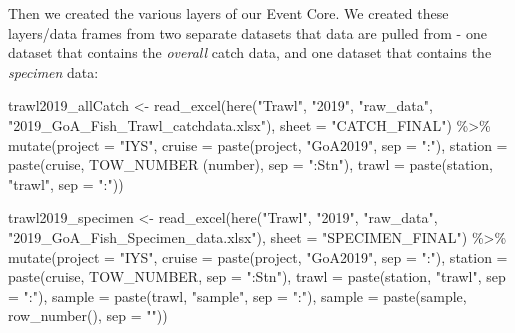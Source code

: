 \documentclass[
]{book}
\newenvironment{Shaded}{\begin{snugshade}}{\end{snugshade}}
\newcommand{\AttributeTok}[1]{\textcolor[rgb]{0.77,0.63,0.00}{#1}}
\newcommand{\FunctionTok}[1]{\textcolor[rgb]{0.00,0.00,0.00}{#1}}
\newcommand{\NormalTok}[1]{#1}
\newcommand{\OtherTok}[1]{\textcolor[rgb]{0.56,0.35,0.01}{#1}}
\newcommand{\SpecialCharTok}[1]{\textcolor[rgb]{0.00,0.00,0.00}{#1}}
\newcommand{\StringTok}[1]{\textcolor[rgb]{0.31,0.60,0.02}{#1}}
\begin{document}
Then we created the various layers of our Event Core. We created these layers/data frames from two separate datasets that data are pulled from - one dataset that contains the \emph{overall} catch data, and one dataset that contains the \emph{specimen} data:

\begin{Shaded}
\begin{Highlighting}[]
\NormalTok{trawl2019\_allCatch }\OtherTok{\textless{}{-}} \FunctionTok{read\_excel}\NormalTok{(}\FunctionTok{here}\NormalTok{(}\StringTok{"Trawl"}\NormalTok{, }\StringTok{"2019"}\NormalTok{, }\StringTok{"raw\_data"}\NormalTok{, }
                                      \StringTok{"2019\_GoA\_Fish\_Trawl\_catchdata.xlsx"}\NormalTok{), }\AttributeTok{sheet =} \StringTok{"CATCH\_FINAL"}\NormalTok{) }\SpecialCharTok{\%\textgreater{}\%}
  \FunctionTok{mutate}\NormalTok{(}\AttributeTok{project =} \StringTok{"IYS"}\NormalTok{,}
         \AttributeTok{cruise =} \FunctionTok{paste}\NormalTok{(project, }\StringTok{"GoA2019"}\NormalTok{, }\AttributeTok{sep =} \StringTok{":"}\NormalTok{),}
         \AttributeTok{station =} \FunctionTok{paste}\NormalTok{(cruise, }\StringTok{\textasciigrave{}}\AttributeTok{TOW\_NUMBER (number)}\StringTok{\textasciigrave{}}\NormalTok{, }\AttributeTok{sep =} \StringTok{":Stn"}\NormalTok{),}
         \AttributeTok{trawl =} \FunctionTok{paste}\NormalTok{(station, }\StringTok{"trawl"}\NormalTok{, }\AttributeTok{sep =} \StringTok{":"}\NormalTok{))}

\NormalTok{trawl2019\_specimen }\OtherTok{\textless{}{-}} \FunctionTok{read\_excel}\NormalTok{(}\FunctionTok{here}\NormalTok{(}\StringTok{"Trawl"}\NormalTok{, }\StringTok{"2019"}\NormalTok{, }\StringTok{"raw\_data"}\NormalTok{, }\StringTok{"2019\_GoA\_Fish\_Specimen\_data.xlsx"}\NormalTok{), }
                                 \AttributeTok{sheet =} \StringTok{"SPECIMEN\_FINAL"}\NormalTok{) }\SpecialCharTok{\%\textgreater{}\%}
  \FunctionTok{mutate}\NormalTok{(}\AttributeTok{project =} \StringTok{"IYS"}\NormalTok{,}
         \AttributeTok{cruise =} \FunctionTok{paste}\NormalTok{(project, }\StringTok{"GoA2019"}\NormalTok{, }\AttributeTok{sep =} \StringTok{":"}\NormalTok{),}
         \AttributeTok{station =} \FunctionTok{paste}\NormalTok{(cruise, TOW\_NUMBER, }\AttributeTok{sep =} \StringTok{":Stn"}\NormalTok{),}
         \AttributeTok{trawl =} \FunctionTok{paste}\NormalTok{(station, }\StringTok{"trawl"}\NormalTok{, }\AttributeTok{sep =} \StringTok{":"}\NormalTok{),}
         \AttributeTok{sample =} \FunctionTok{paste}\NormalTok{(trawl, }\StringTok{"sample"}\NormalTok{, }\AttributeTok{sep =} \StringTok{":"}\NormalTok{),}
         \AttributeTok{sample =} \FunctionTok{paste}\NormalTok{(sample, }\FunctionTok{row\_number}\NormalTok{(), }\AttributeTok{sep =} \StringTok{""}\NormalTok{))}
\end{Highlighting}
\end{Shaded}
\end{document}
